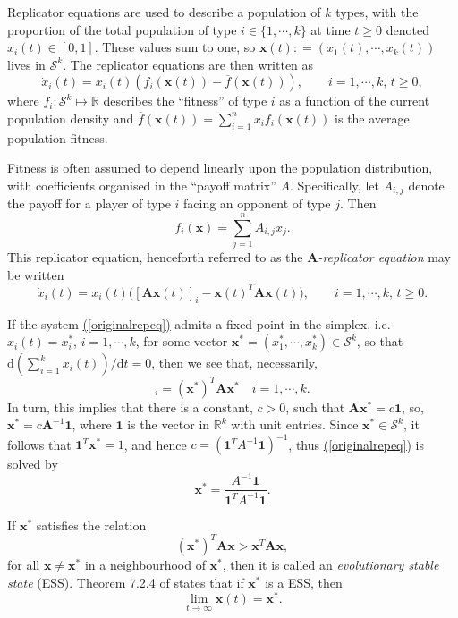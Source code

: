 \documentclass[12pt, leqno]{article}
\renewcommand{\eqref}[1]{\hyperref[#1]{(\ref*{#1})}}
\newcommand{\dd}{{\mathrm d}}
\begin{document}
Replicator equations are used to describe a population of $k$ types, with the proportion of the total population of type $i\in\{1,\cdots, k\}$ at time $t\geq0$ denoted $x_i(t)\in[0,1]$. These values sum to one, so $\bm{x}(t): = (x_1(t),\cdots, x_k(t))$ lives in $\mathcal{S}^k$.  The replicator equations are then written as
  \[ 
  \dot x_i(t)=x_i(t)(f_i(\bm{x}(t))-\overline{f}(\bm{x}(t))), \qquad i = 1,\cdots, k,\,  t\geq0,
  \]
where $f_i:\mathcal{S}^k\mapsto \mathbb{R}$ describes the ``fitness'' of type $i$ as a function of the current population density and  $\overline{f}(\bm{x}(t))=\sum_{i=1}^nx_if_i(\bm{x}(t))$ is the average population fitness. 

\medskip

Fitness is often assumed to depend linearly upon the population distribution, with coefficients organised in the ``payoff matrix'' $A$. Specifically, let $A_{i,j}$ denote the payoff for a player of type $i$ facing an opponent of type $j$. Then
\[f_i(\bm{x})=\sum_{j=1}^n A_{i,j}x_j.
\] 
This  replicator equation, henceforth referred to as the {\it $\bm A$-replicator equation} may be written
\begin{equation}\label{originalrepeq}
 \dot x_i(t)=x_i(t)\big([{\bm A} {\bm x}(t)]_i-{\bm x}(t)^T{\bm A} {\bm x}(t)\big), \qquad i = 1,\cdots,k, \, t\geq0.
\end{equation}

If the system \eqref{originalrepeq} admits a fixed point in the simplex, i.e. $x_i(t) = x^*_i$, $i = 1, \cdots, k$, for some vector ${\bm x}^* = (x^*_1, \cdots, x^*_k)\in\mathcal{S}^k$, so that $\dd(\sum_{i=1}^k x_i(t))/\dd t=0$, then we see  that, necessarily,
 \begin{equation}
[\bm{A}\bm{x}^*]_i=(\bm{x}^*)^T\bm{A}\bm{x}^* \quad i =1, \cdots, k. 
\label{fixedpoint}
\end{equation}
In turn, this  implies that there is a constant, $c>0$, such that ${\bm A}{\bm x}^*=c\bm{1}$, so, ${\bm x}^*=c\bm{A}^{-1}\bm{1}$, where $\bm 1$ is the vector in $\mathbb{R}^k$ with unit entries. Since ${\bm x}^*\in\mathcal{S}^k$, it follows that $\bm{1}^T{\bm x}^*=1$, and hence   $c=(\bm{1}^TA^{-1}\bm{1})^{-1}$, thus \eqref{originalrepeq} is solved by %
\begin{equation}
{\bm x}^*=\dfrac{A^{-1}\bm{1}}{\bm{1}^TA^{-1}\bm{1}}.
\end{equation}

\medskip

If ${\bm x}^*$ satisfies the relation 
\[
({\bm x}^*)^T{\bm A}{\bm x} >{\bm x}^T{\bm A}{\bm x}, %
\]
for all $ {\bm x}\neq \bm x^*$ in a neighbourhood of $\bm x^*$,
then it is called an {\it evolutionary stable state} (ESS). Theorem 7.2.4 of \cite{HS} states that if ${\bm x}^*$ is a ESS, then 
\begin{equation}
\lim_{t\to\infty}{\bm x}(t) = {\bm x}^*.
\label{ESScgce}
\end{equation}
\end{document}
